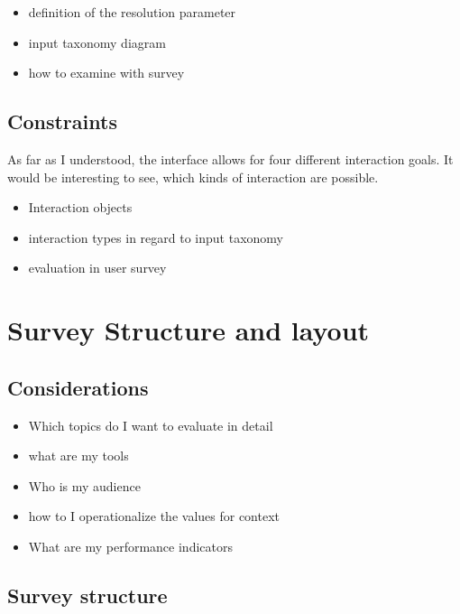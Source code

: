             \begin{itemize}
                \item definition of the resolution parameter
                \item input taxonomy diagram
                \item how to examine with survey                                     
            \end{itemize}

        \section{Constraints}

            As far as I understood, the interface allows for four different interaction goals. It would be interesting to see, which kinds of interaction are possible.                

            \begin{itemize}
                \item Interaction objects
                \item interaction types in regard to input taxonomy
                \item evaluation in user survey
            \end{itemize}

    \chapter{Survey Structure and layout}

        \section{Considerations}

            \begin{itemize}
                \item Which topics do I want to evaluate in detail
                \item what are my tools
                \item Who is my audience
                \item how to I operationalize the values for context
                \item What are my performance indicators
            \end{itemize}

        \section{Survey structure}

